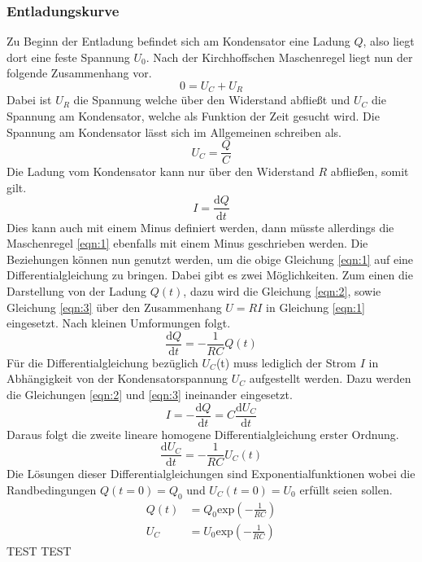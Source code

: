 \subsubsection{Entladungskurve}
Zu Beginn der Entladung befindet sich am Kondensator eine Ladung $Q$, also liegt dort eine feste Spannung $U_{0}$. 
Nach der Kirchhoffschen Maschenregel liegt nun der folgende Zusammenhang vor.
\begin{equation}
\label{eqn:1}
    0 = U_{C} + U_{R}
\end{equation}
Dabei ist $U_{R}$ die Spannung welche über den Widerstand abfließt und $U_{C}$ die Spannung am Kondensator, welche als Funktion der Zeit gesucht wird. 
Die Spannung am Kondensator lässt sich im Allgemeinen schreiben als.
\begin{equation}
\label{eqn:2}
    U_{C} = \frac{Q}{C}
\end{equation}
Die Ladung vom Kondensator kann nur über den Widerstand $R$ abfließen, somit gilt.
\begin{equation}
\label{eqn:3}
    I = \frac{\text{d}Q}{\text{d}t}
\end{equation}
Dies kann auch mit einem Minus definiert werden, dann müsste allerdings die Maschenregel \eqref{eqn:1} ebenfalls mit einem Minus geschrieben werden.
Die Beziehungen können nun genutzt werden, um die obige Gleichung \eqref{eqn:1} auf eine Differentialgleichung zu bringen. Dabei gibt es zwei Möglichkeiten. Zum einen die Darstellung von der Ladung $Q(t)$, dazu wird die Gleichung \eqref{eqn:2}, sowie Gleichung \eqref{eqn:3} über den Zusammenhang $U = RI$ in Gleichung \eqref{eqn:1} eingesetzt. Nach kleinen Umformungen folgt.
\begin{equation}
    \frac{\text{d}Q}{\text{d}t} = - \frac{1}{RC} Q(t)
\end{equation}
Für die Differentialgleichung bezüglich $U_{C}$(t) muss lediglich der Strom $I$ in Abhängigkeit von der Kondensatorspannung $U_{C}$ aufgestellt werden. Dazu werden die Gleichungen \eqref{eqn:2} und \eqref{eqn:3} ineinander eingesetzt.
\begin{equation}
    I = -\frac{\text{d}Q}{\text{d}t} = C \frac{\text{d}U_{C}}{\text{d}t}
\end{equation}
Daraus folgt die zweite lineare homogene Differentialgleichung erster Ordnung.
\begin{equation}
    \frac{\text{d}U_{C}}{\text{d}t} = - \frac{1}{RC} U_{C}(t)
\end{equation}
Die Lösungen dieser Differentialgleichungen sind Exponentialfunktionen wobei die Randbedingungen $Q(t=0) = Q_{0}$ und $U_{C}(t=0) = U_{0}$ erfüllt seien sollen.
\begin{align}
    Q(t) &= Q_{0}\text{exp}(- \frac{1}{RC}) \\
    U_{C} &= U_{0} \text{exp}(- \frac{1}{RC})
\end{align}
TEST TEST
